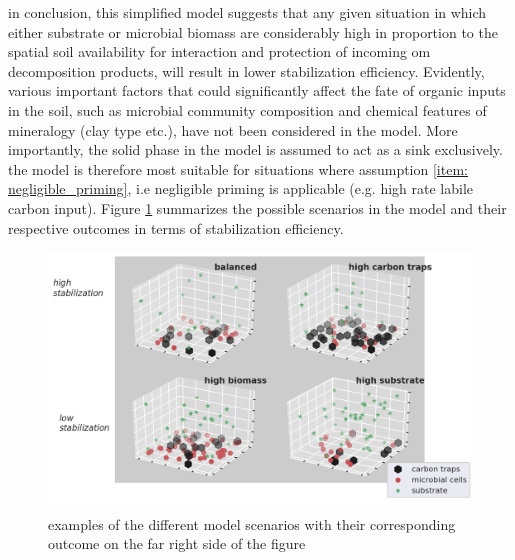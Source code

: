 	 in conclusion, this simplified model suggests that any given situation in which either substrate or microbial biomass are considerably high in proportion to the spatial soil availability for interaction and protection of incoming \gls{om} decomposition products, will result in lower stabilization efficiency. Evidently, various important factors that could significantly affect the fate of organic inputs in the soil, such as microbial community composition and  chemical features of mineralogy (clay type etc.), have not been considered in the model. More importantly, the solid phase in the model is assumed to act as a sink exclusively. the model is therefore most suitable for situations where assumption \ref{item: negligible_priming}, i.e negligible priming is applicable (e.g. high rate labile carbon input). Figure \ref{fig:stabilization_model_scenarios} summarizes the possible scenarios in the model and their respective outcomes in terms of stabilization efficiency.\\

	 \begin{figure}[H]
	 	\centering
	 	\includegraphics[scale=0.8]{thesis_figures/test/model_scenarios.png}
	 	\caption{examples of the different model scenarios with their corresponding outcome on the far right side of the figure}
	 	\label{fig:stabilization_model_scenarios}
	 \end{figure}

